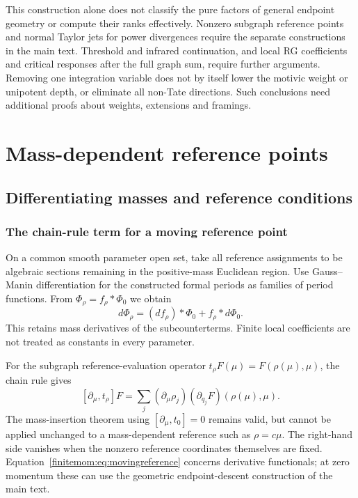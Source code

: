 \documentclass[11pt,a4paper,oneside]{article}
\theoremstyle{plain}
\theoremstyle{definition}
\theoremstyle{remark}
\newcommand{\Q}{\mathbb Q}
\numberwithin{equation}{section}
\begin{document}
This construction alone does not classify the pure factors of general endpoint geometry or compute their ranks effectively. Nonzero subgraph reference points and normal Taylor jets for power divergences require the separate constructions in the main text. Threshold and infrared continuation, and local RG coefficients and critical responses after the full graph sum, require further arguments. Removing one integration variable does not by itself lower the motivic weight or unipotent depth, or eliminate all non-Tate directions. Such conclusions need additional proofs about weights, extensions and framings.
\endgroup


\section{Mass-dependent reference points}\label{supp:finitemom}
\begingroup
\providecommand{\Q}{\mathbb Q}
\providecommand{\cP}{\mathcal P}
\providecommand{\cC}{\mathcal C}
\providecommand{\ev}{\operatorname{ev}}
\providecommand{\per}{\operatorname{per}}
\providecommand{\eps}{\varepsilon_H}
\subsection{Differentiating masses and reference conditions}
\subsubsection{The chain-rule term for a moving reference point}
On a common smooth parameter open set, take all reference assignments to be algebraic sections remaining in the positive-mass Euclidean region. Use Gauss--Manin differentiation for the constructed formal periods as families of period functions. From $\Phi_\rho=f_\rho*\Phi_0$ we obtain
\begin{equation}\label{finitemom:eq:leibniz}
 d\Phi_\rho=(df_\rho)*\Phi_0+f_\rho*d\Phi_0.
\end{equation}
This retains mass derivatives of the subcounterterms. Finite local coefficients are not treated as constants in every parameter.

For the subgraph reference-evaluation operator $t_\rho F(\mu)=F(\rho(\mu),\mu)$, the chain rule gives
\begin{equation}\label{finitemom:eq:movingreference}
 [\partial_\mu,t_\rho]F
    =\sum_j(\partial_\mu\rho_j)
                           (\partial_{q_j}F)(\rho(\mu),\mu).
\end{equation}
The mass-insertion theorem using $[\partial_\mu,t_0]=0$ remains valid, but cannot be applied unchanged to a mass-dependent reference such as $\rho=c\mu$. The right-hand side vanishes when the nonzero reference coordinates themselves are fixed. Equation~\eqref{finitemom:eq:movingreference} concerns derivative functionals; at zero momentum these can use the geometric endpoint-descent construction of the main text.
\end{document}
